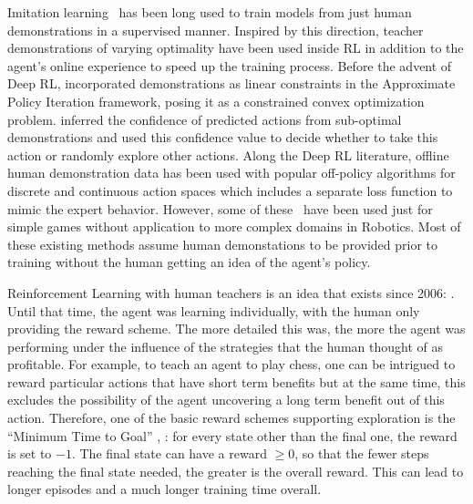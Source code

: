 Imitation learning~\cite{SchaalXXX} has been long used to train models from just human demonstrations in a supervised manner. Inspired by this direction, teacher demonstrations of varying optimality have been used inside RL in addition to the agent's online experience to speed up the training process. Before the advent of Deep RL, \cite{kim2013learning} incorporated  demonstrations as linear constraints in the Approximate Policy Iteration framework, posing it as a constrained convex optimization problem. \cite{WangXXX} inferred the confidence of predicted actions from  sub-optimal demonstrations and used this confidence value to decide whether to take this action or randomly explore other actions. Along the Deep RL literature, offline human demonstration data has been used with popular off-policy algorithms for discrete\cite{hester2018deep} and continuous action spaces\cite{nair2018overcoming,vecerik2017leveraging} which includes a separate loss function to mimic the expert behavior. However, some of these~\cite{hester2018deep} have been used just for simple games without application to more complex domains in Robotics. Most of these existing methods assume human demonstations to be provided prior to training without the human getting an idea of the agent's policy.


Reinforcement Learning with human teachers is an idea that exists since 2006: \cite{Thomaz:2006:RLWithHumanTeachers}. Until that time, the agent was learning individually, with the human only providing the reward scheme. The more detailed this was, the more the agent was performing under the influence of the strategies that the human thought of as profitable. For example, to teach an agent to play chess, one can be intrigued to reward particular actions that have short term benefits but at the same time, this excludes the possibility of the agent uncovering a long term benefit out of this action. Therefore, one of the basic reward schemes supporting exploration is the ``Minimum Time to Goal'' \cite{Harmon:1997:ReinforcementLearningATutorial}, \cite{SuttonBarto:2018:RLIntroduction}: for every state other than the final one, the reward is set to $-1$. The final state can have a reward $\geq 0$, so that the fewer steps reaching the final state needed, the greater is the overall reward. This can lead to longer episodes and a much longer training time overall. 

